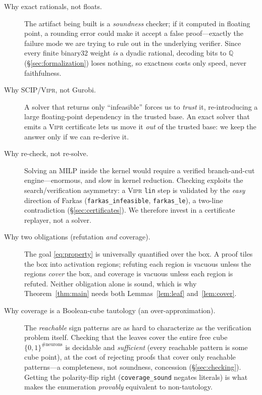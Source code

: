 \documentclass[runningheads]{llncs}
\newcommand{\Q}{\mathbb{Q}}
\newcommand{\vipr}{\textsc{Vipr}}
\newcommand{\code}[1]{\texttt{#1}}
\begin{document}
\begin{description}
  \item[Why exact rationals, not floats.] The artifact being built is a
    \emph{soundness} checker; if it computed in floating point, a rounding error
    could make it accept a false proof---exactly the failure mode we are trying to
    rule out in the underlying verifier. Since every finite binary32 weight
    \emph{is} a dyadic rational, decoding bits to $\Q$ (\S\ref{sec:formalization})
    loses nothing, so exactness costs only speed, never faithfulness.

  \item[Why SCIP/\vipr{}, not Gurobi.] A solver that returns only ``infeasible''
    forces us to \emph{trust} it, re-introducing a large floating-point dependency
    in the trusted base. An exact solver that emits a \vipr{} certificate lets us
    move it \emph{out} of the trusted base: we keep the answer only if we can
    re-derive it.

  \item[Why re-check, not re-solve.] Solving an MILP inside the kernel would require
    a verified branch-and-cut engine---enormous, and slow in kernel reduction.
    Checking exploits the search/verification asymmetry: a \vipr{} \code{lin} step is
    validated by the \emph{easy} direction of Farkas (\code{farkas\_infeasible},
    \code{farkas\_le}), a two-line contradiction (\S\ref{sec:certificates}). We
    therefore invest in a certificate replayer, not a solver.

  \item[Why two obligations (refutation \emph{and} coverage).] The goal
    \eqref{eq:property} is universally quantified over the box. A proof tiles the box
    into activation regions; refuting each region is vacuous unless the regions
    \emph{cover} the box, and coverage is vacuous unless each region is refuted.
    Neither obligation alone is sound, which is why
    Theorem~\ref{thm:main} needs both Lemmas~\ref{lem:leaf} and~\ref{lem:cover}.

  \item[Why coverage is a Boolean-cube tautology (an over-approximation).] The
    \emph{reachable} sign patterns are as hard to characterize as the verification
    problem itself. Checking that the leaves cover the entire free cube
    $\{0,1\}^{\#\text{neurons}}$ is decidable and \emph{sufficient} (every reachable
    pattern is some cube point), at the cost of rejecting proofs that cover only
    reachable patterns---a completeness, not soundness, concession
    (\S\ref{sec:checking}). Getting the polarity-flip right
    (\code{coverage\_sound} negates literals) is what makes the enumeration
    \emph{provably} equivalent to non-tautology.


\end{description}
\end{document}
